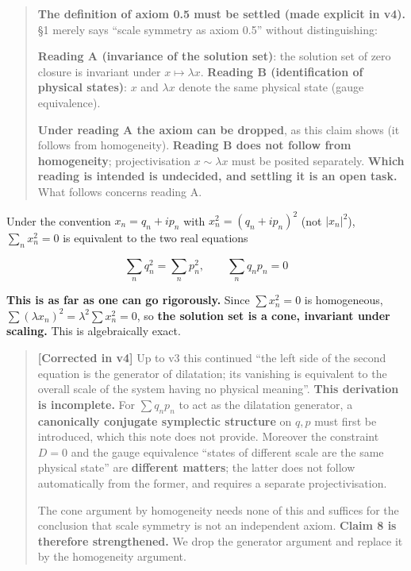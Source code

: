 \documentclass[
  10pt,
]{article}
\newcounter{none} %
\begin{document}
\begin{quote}
\textbf{The definition of axiom 0.5 must be settled (made explicit in
v4).} §1 merely says ``scale symmetry as axiom 0.5'' without
distinguishing:

\textbf{Reading A (invariance of the solution set)}: the solution set of
zero closure is invariant under \(x\mapsto\lambda x\). \textbf{Reading B
(identification of physical states)}: \(x\) and \(\lambda x\) denote the
same physical state (gauge equivalence).

\textbf{Under reading A the axiom can be dropped}, as this claim shows
(it follows from homogeneity). \textbf{Reading B does not follow from
homogeneity}; projectivisation \(x\sim\lambda x\) must be posited
separately. \textbf{Which reading is intended is undecided, and settling
it is an open task.} What follows concerns reading A.
\end{quote}

Under the convention \(x_n = q_n + ip_n\) with \(x_n^2 = (q_n+ip_n)^2\)
(not \(|x_n|^2\)), \(\sum_n x_n^2 = 0\) is equivalent to the two real
equations

\[\sum_n q_n^2 = \sum_n p_n^2, \qquad \sum_n q_np_n = 0\]

\textbf{This is as far as one can go rigorously.} Since
\(\sum x_n^2 = 0\) is homogeneous,
\(\sum(\lambda x_n)^2 = \lambda^2\sum x_n^2 = 0\), so \textbf{the
solution set is a cone, invariant under scaling.} This is algebraically
exact.

\begin{quote}
\textbf{{[}Corrected in v4{]}} Up to v3 this continued ``the left side
of the second equation is the generator of dilatation; its vanishing is
equivalent to the overall scale of the system having no physical
meaning''. \textbf{This derivation is incomplete.} For \(\sum q_np_n\)
to act as the dilatation generator, a \textbf{canonically conjugate
symplectic structure} on \(q,p\) must first be introduced, which this
note does not provide. Moreover the constraint \(D=0\) and the gauge
equivalence ``states of different scale are the same physical state''
are \textbf{different matters}; the latter does not follow automatically
from the former, and requires a separate projectivisation.

The cone argument by homogeneity needs none of this and suffices for the
conclusion that scale symmetry is not an independent axiom.
\textbf{Claim 8 is therefore strengthened.} We drop the generator
argument and replace it by the homogeneity argument.
\end{quote}
\end{document}
